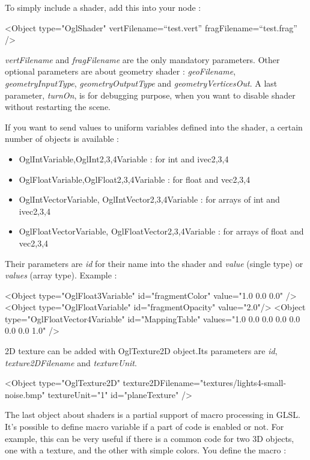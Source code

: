 To simply include a shader, add this into your node :
	\begin{code_xml}
		<Object type="OglShader" vertFilename=``test.vert'' fragFilename=``test.frag'' />
	\end{code_xml}

\textit{vertFilename} and \textit{fragFilename} are the only mandatory parameters. Other optional parameters are about geometry shader : \textit{geoFilename}, \textit{geometryInputType}, \textit{geometryOutputType} and \textit{geometryVerticesOut}. A last parameter, \textit{turnOn}, is for debugging purpose, when you want to disable shader without restarting the scene.

If you want to send values to uniform variables defined into the shader, a certain number of objects is available : 
\begin{itemize}
 \item OglIntVariable,OglInt{2,3,4}Variable : for int and ivec{2,3,4}
 \item OglFloatVariable,OglFloat{2,3,4}Variable : for float and vec{2,3,4}
 \item OglIntVectorVariable, OglIntVector{2,3,4}Variable : for arrays of int and ivec{2,3,4}
 \item OglFloatVectorVariable, OglFloatVector{2,3,4}Variable : for arrays of float and vec{2,3,4}
\end{itemize}

Their parameters are \textit{id} for their name into the shader and \textit{value} (single type) or \textit{values} (array type).
Example : 
	\begin{code_xml}
		<Object type="OglFloat3Variable" id="fragmentColor" value="1.0 0.0 0.0" />
		<Object type="OglFloatVariable" id="fragmentOpacity" value="2.0"/>
		<Object type="OglFloatVector4Variable" id="MappingTable" values="1.0 0.0 0.0 0.0 0.0 0.0 0.0 1.0" />
	\end{code_xml}

2D texture can be added with OglTexture2D object.Its parameters are \textit{id}, \textit{texture2DFilename} and \textit {textureUnit}.

	\begin{code_xml} 
		<Object type="OglTexture2D" texture2DFilename="textures/lights4-small-noise.bmp" textureUnit="1" id="planeTexture" />
	\end{code_xml}

The last object about shaders is a partial support of macro processing in GLSL. It's possible to define macro variable if a part of code is enabled or not. For example, this can be very useful if there is a common code for two 3D objects, one with a texture, and the other with simple colors. You define the macro :

